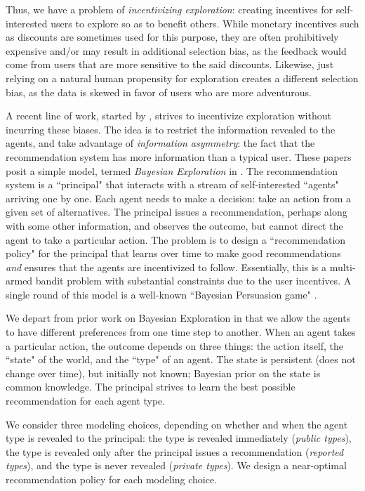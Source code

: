 Thus, we have a problem of \emph{incentivizing exploration}: creating incentives for self-interested users to explore so as to benefit others. While monetary incentives such as discounts are sometimes used for this purpose, they are often prohibitively expensive and/or may result in additional selection bias, as the feedback would come from users that are more sensitive to the said discounts. Likewise, just relying on a natural human propensity for exploration creates a different selection bias, as the data is skewed in favor of users who are more adventurous.

A recent line of work, started by \cite{Kremer-JPE14}, strives to incentivize exploration without incurring these biases. The idea is to restrict the information revealed to the agents, and take advantage of \emph{information asymmetry}: the fact that the recommendation system has more information than a typical user. These papers posit a simple model, termed \emph{Bayesian Exploration} in \cite{ICexplorationGames-ec16}. The recommendation system is a ``principal" that interacts with a stream of self-interested ``agents" arriving one by one. Each agent needs to make a decision: take an action from a given set of alternatives. The principal issues a recommendation, perhaps along with some other information, and observes the outcome, but cannot direct the agent to take a particular action. The problem is to design a ``recommendation policy" for the principal that learns over time to make good recommendations \emph{and} ensures that the agents are incentivized to follow. Essentially, this is a multi-armed bandit problem with substantial constraints due to the user incentives. A single round of this model is a well-known ``Bayesian Persuasion game" \cite{Kamenica-aer11}.

We depart from prior work on Bayesian Exploration in that we allow the agents to have different preferences from one time step to another. When an agent takes a particular action, the outcome depends on three things: the action itself, the ``state" of the world, and the ``type" of an agent. The state is persistent (does not change over time), but initially not known; Bayesian prior on the state is common knowledge. The principal strives to learn the best possible recommendation for each agent type.

We consider three modeling choices, depending on whether and when the agent type is revealed to the principal: the type is revealed immediately (\emph{public types}), the type is revealed only after the principal issues a recommendation (\emph{reported types}), and the type is never revealed (\emph{private types}). We design a near-optimal recommendation policy for each modeling choice. 

